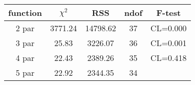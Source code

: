 \begin{tabular}{c|c|c|c|c}
function & $\chi^2$ & RSS & ndof & F-test \\
\hline
2 par & 3771.24 & 14798.62 & 37 & CL=0.000 \\
3 par & 25.83 & 3226.07 & 36 & CL=0.001 \\
4 par & 22.43 & 2389.26 & 35 & CL=0.418 \\
5 par & 22.92 & 2344.35 & 34 & \\
\hline
\end{tabular}